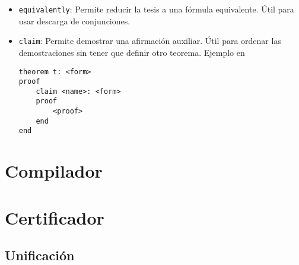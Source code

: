 \begin{itemize}
    \item \lstinline{equivalently}: Permite reducir la tesis a una fórmula
    equivalente. Útil para usar descarga de conjunciones.
    
    

    \item \lstinline{claim}: Permite demostrar una afirmación auxiliar. Útil
    para ordenar las demostraciones sin tener que definir otro teorema. Ejemplo
    en 

    \begin{lstlisting}[numbers=none]
theorem t: <form>
proof
    claim <name>: <form>
    proof
        <proof>
    end
end
    \end{lstlisting}
\end{itemize}


\section{Compilador}

\section{Certificador}




\subsection{Unificación}
\label{ppa:sec:unification}